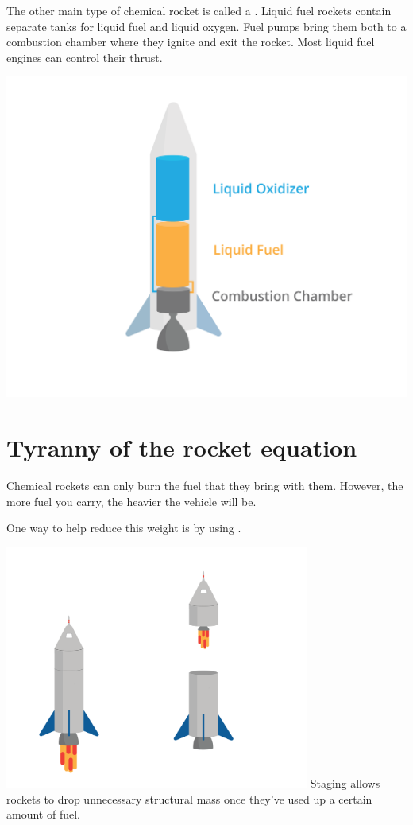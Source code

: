 The other main type of chemical rocket is called a . Liquid fuel rockets contain separate tanks for liquid fuel and liquid oxygen. Fuel pumps bring them both to a combustion chamber where they ignite and exit the rocket. Most liquid fuel engines can control their thrust. 


\includegraphics[width=1\textwidth]{liquid.png}


\section{Tyranny of the rocket equation}
	Chemical rockets can only burn the fuel that they bring with them. However, the more fuel you carry, the heavier the vehicle will be.

 

	One way to help reduce this weight is by using . 

\includegraphics[width=0.75\textwidth]{stagingDual.png}
	Staging allows rockets to drop unnecessary structural mass once they've used up a certain amount of fuel. 



